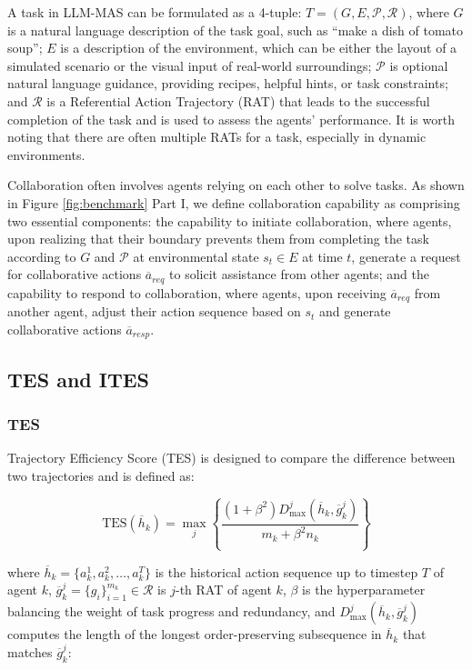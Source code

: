 \documentclass[11pt]{article}
\begin{document}
A task in LLM-MAS can be formulated as a 4-tuple:  $ T = (G, E, \mathcal{P}, \mathcal{R})$, where $ G $ is a natural language description of the task goal, such as ``make a dish of tomato soup''; $ E $ is a description of the environment, which can be either the layout of a simulated scenario or the visual input of real-world surroundings; $ \mathcal{P} $ is optional natural language guidance, providing recipes, helpful hints, or task constraints; and $ \mathcal{R} $ is a Referential Action Trajectory (RAT) that leads to the successful completion of the task and is used to assess the agents' performance. It is worth noting that there are often multiple RATs for a task, especially in dynamic environments.

Collaboration often involves agents relying on each other to solve tasks. As shown in Figure \ref{fig:benchmark} Part I, we define collaboration capability as comprising two essential components: the capability to initiate collaboration, where agents, upon realizing that their boundary prevents them from completing the task according to $ G $ and $ \mathcal{P} $ at environmental state $ s_t \in E $ at time $ t $, generate a request for collaborative actions $ \overline{a}_{req} $ to solicit assistance from other agents; and the capability to respond to collaboration, where agents, upon receiving $ \overline{a}_{req} $ from another agent, adjust their action sequence based on $ s_t $ and generate collaborative actions $ \overline{a}_{resp} $.



\subsection{TES and ITES}
\subsubsection{TES}
 
Trajectory Efficiency Score (TES) is designed to compare the difference between two trajectories and is defined as:  


\begin{equation}
  \label{eq:sea}
\text{TES}(\overline{h}_k) = \max_j\left\{\frac{(1+\beta^2)D_{\text{max}}^j(\overline{h}_k, \overline{g}_k^j)}{m_k + \beta^2 n_k}\right\}
\end{equation}

\noindent where $\overline{h}_k= \{a_k^1, a_k^2, \ldots, a_k^T\}$ is the historical action sequence up to timestep $T$ of agent $k$, $\overline{g}_k^j=\{g_i\}_{i=1}^{m_k} \in \mathcal{R}$ is $j$-th RAT of agent $k$, $\beta$ is the hyperparameter balancing the weight of task progress and redundancy, and $D_{\text{max}}^j(\overline{h}_k, \overline{g}_k^j)$ computes the length of the longest order-preserving subsequence in $\overline{h}_k$ that matches $\overline{g}_k^j$:  
\end{document}
